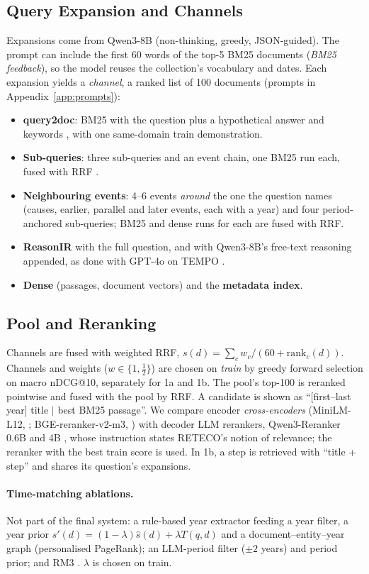 \subsection{Query Expansion and Channels}
\label{sec:channels}
Expansions come from Qwen3-8B \citep{yang2025qwen3} (non-thinking, greedy, JSON-guided). The
prompt can include the first 60 words of the top-5 BM25 documents (\emph{BM25 feedback}), so the
model reuses the collection's vocabulary and dates. Each expansion yields a \emph{channel}, a
ranked list of 100 documents (prompts in Appendix~\ref{app:prompts}):
\begin{itemize}
  \setlength\itemsep{0pt}
  \item \textbf{query2doc}: BM25 with the question plus a hypothetical answer and keywords
        \citep{wang2023query2doc}, with one same-domain train demonstration.
  \item \textbf{Sub-queries}: three sub-queries and an event chain, one BM25 run each, fused
        with RRF \citep{rackauckas2024ragfusion}.
  \item \textbf{Neighbouring events}: 4--6 events \emph{around} the one the question names
        (causes, earlier, parallel and later events, each with a year) and four period-anchored
        sub-queries; BM25 and dense runs for each are fused with RRF.
  \item \textbf{ReasonIR} with the full question, and with Qwen3-8B's free-text reasoning
        appended, as done with GPT-4o on TEMPO \citep{abdallah2026tempo}.
  \item \textbf{Dense} (passages, document vectors) and the \textbf{metadata index}.
\end{itemize}

\subsection{Pool and Reranking}
\label{sec:pool}
Channels are fused with weighted RRF, $s(d){=}\sum_c w_c/(60{+}\mathrm{rank}_c(d))$. Channels and
weights ($w\in\{1,\tfrac12\}$) are chosen on \emph{train} by greedy forward selection on macro
nDCG@10, separately for 1a and 1b. The pool's top-100 is reranked pointwise and fused with the
pool by RRF. A candidate is shown as ``[first--last year] title $|$ best BM25 passage''. We
compare encoder \emph{cross-encoders} (MiniLM-L12, \citealp{wang2020minilm}; BGE-reranker-v2-m3,
\citealp{chen2024bgem3}) with decoder LLM rerankers, Qwen3-Reranker 0.6B and 4B
\citep{zhang2025qwen3emb}, whose instruction states RETECO's notion of relevance; the reranker
with the best train score is used. In 1b, a step is retrieved with ``title + step'' and shares
its question's expansions.

\paragraph{Time-matching ablations.} Not part of the final system: a rule-based year extractor
feeding a year filter, a year prior $s'(d){=}(1{-}\lambda)\hat s(d){+}\lambda T(q,d)$ and a
document--entity--year graph (personalised PageRank); an LLM-period filter ($\pm2$ years) and
period prior; and RM3 \citep{lavrenko2001relevance,abduljaleel2004umass}. $\lambda$ is chosen on
train.

